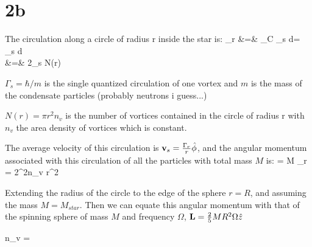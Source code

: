 \documentclass[a4paper,11pt]{article}
\begin{document}
\section*{2b}
The circulation along a circle of radius r inside the star is:
\pi\Gamma_r &=& \int_C \vv_s \cdot  d\vl = \int \int \vec{\nabla}\times\vv_s \cdot d\vs \\
 &=& 2\pi\Gamma_s  N(r)
\eea

$\Gamma_s = \hbar/m$ is the single quantized circulation of one vortex and $m$ is the mass of the condensate particles (probably neutrons i guess...)

$N(r) = \pi r^2 n_v $ is the number of vortices contained in the circle of radius r with $n_v$ the area density of vortices which is constant.

The average velocity of this circulation is ${\bf v}_s = \frac{\Gamma_r}{r} \hat{\phi}$, and the angular momentum associated with this circulation of all the particles with total mass $M$ is:
\bea
\vL = M \Gamma_r  =  2\pi^2\hbar n_v r^2  
\eea

Extending the radius of the circle to the edge of the sphere $r=R$, and assuming the mass $M=M_{star}$. Then we can equate this angular momentum with that of the spinning sphere of mass $M$ and frequency $\Omega$, ${\bf L} = \frac{2}{5}MR^2\Omega\hat{z}$

\bea
n_v = 
\eea
\end{document}
